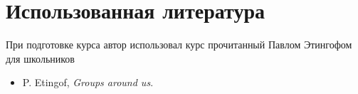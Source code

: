 \documentclass[amsmath,amssymb,12pt]{revtex4}
\newcommand{\1}{\frac{1}{2}}
\begin{document}
\maketitle

\newpage
\tableofcontents



%
%		

\newpage 
\section*{\large Использованная литература}
\setcounter{prn}{0}


При подготовке курса автор использовал курс прочитанный Павлом Этингофом для школьников 
\begin{itemize}
	\item P. Etingof, \textit{Groups around us}. 
\end{itemize}
\end{document}
